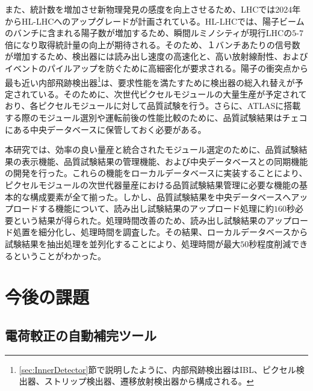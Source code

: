 また、統計数を増加させ新物理発見の感度を向上させるため、LHCでは2024年からHL-LHCへのアップグレードが計画されている。HL-LHCでは、陽子ビームのバンチに含まれる陽子数が増加するため、瞬間ルミノシティが現行LHCの$5$-$7$倍になり取得統計量の向上が期待される。そのため、１バンチあたりの信号数が増加するため、検出器には読み出し速度の高速化と、高い放射線耐性、およびイベントのパイルアップを防ぐために高細密化が要求される。陽子の衝突点から最も近い内部飛跡検出器\footnote{\ref{sec:InnerDetector}節で説明したように、内部飛跡検出器はIBL、ピクセル検出器、ストリップ検出器、遷移放射検出器から構成される。}は、要求性能を満たすために検出器の総入れ替えが予定されている。そのために、次世代ピクセルモジュールの大量生産が予定されており、各ピクセルモジュールに対して品質試験を行う。さらに、ATLASに搭載する際のモジュール選別や運転前後の性能比較のために、品質試験結果はチェコにある中央データベースに保管しておく必要がある。

本研究では、効率の良い量産と統合されたモジュール選定のために、品質試験結果の表示機能、品質試験結果の管理機能、および中央データベースとの同期機能の開発を行った。これらの機能をローカルデータベースに実装することにより、ピクセルモジュールの次世代器量産における品質試験結果管理に必要な機能の基本的な構成要素が全て揃った。しかし、品質試験結果を中央データベースへアップロードする機能について、読み出し試験結果のアップロード処理に約$160$秒必要という結果が得られた。処理時間改善のため、読み出し試験結果のアップロード処置を細分化し、処理時間を調査した。その結果、ローカルデータベースから試験結果を抽出処理を並列化することにより、処理時間が最大$50$秒程度削減できるということがわかった。


\section{今後の課題}
\label{sec:konngonokadai}

\subsection{電荷較正の自動補完ツール}
\label{sec:dennkahoseinokonngonokadai}

